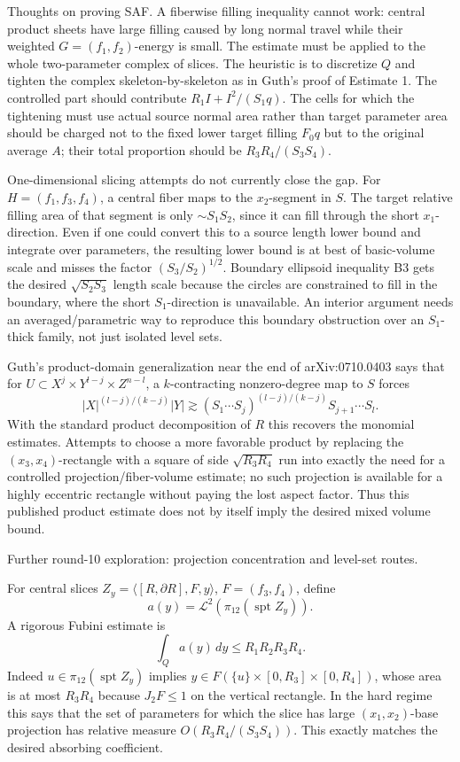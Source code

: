 \documentclass[12pt]{article}
\begin{document}
Thoughts on proving SAF.  A fiberwise filling inequality cannot work: central
product sheets have large filling caused by long normal travel while their
weighted \(G=(f_1,f_2)\)-energy is small.  The estimate must be applied to the
whole two-parameter complex of slices.  The heuristic is to discretize \(Q\) and
tighten the complex skeleton-by-skeleton as in Guth's proof of Estimate 1.  The
controlled part should contribute \(R_1I+I^2/(S_1q)\).  The cells for which the
tightening must use actual source normal area rather than target parameter area
should be charged not to the fixed lower target filling \(F_0q\) but to the
original average \(A\); their total proportion should be
\(R_3R_4/(S_3S_4)\).

One-dimensional slicing attempts do not currently close the gap.  For
\(H=(f_1,f_3,f_4)\), a central fiber maps to the \(x_2\)-segment in \(S\).
The target relative filling area of that segment is only \(\sim S_1S_2\), since
it can fill through the short \(x_1\)-direction.  Even if one could convert this
to a source length lower bound and integrate over parameters, the resulting
lower bound is at best of basic-volume scale and misses the factor
\((S_3/S_2)^{1/2}\).  Boundary ellipsoid inequality B3 gets the desired
\(\sqrt{S_2S_3}\) length scale because the circles are constrained to fill in
the boundary, where the short \(S_1\)-direction is unavailable.  An interior
argument needs an averaged/parametric way to reproduce this boundary obstruction
over an \(S_1\)-thick family, not just isolated level sets.

Guth's product-domain generalization near the end of arXiv:0710.0403 says that
for \(U\subset X^j\times Y^{l-j}\times Z^{n-l}\), a \(k\)-contracting
nonzero-degree map to \(S\) forces
\[
 |X|^{(l-j)/(k-j)}|Y|\gtrsim
 (S_1\cdots S_j)^{(l-j)/(k-j)}S_{j+1}\cdots S_l.
\]
With the standard product decomposition of \(R\) this recovers the monomial
estimates.  Attempts to choose a more favorable product by replacing the
\((x_3,x_4)\)-rectangle with a square of side \(\sqrt{R_3R_4}\) run into exactly
the need for a controlled projection/fiber-volume estimate; no such projection
is available for a highly eccentric rectangle without paying the lost aspect
factor.  Thus this published product estimate does not by itself imply the
desired mixed volume bound.



Further round-10 exploration: projection concentration and level-set routes.

For central slices \(Z_y=\langle [R,\partial R],F,y\rangle\), \(F=(f_3,f_4)\),
define
\[
 a(y)=\mathcal L^2(\pi_{12}(\operatorname{spt}Z_y)).
\]
A rigorous Fubini estimate is
\[
 \int_Q a(y)\,dy\le R_1R_2R_3R_4.
\]
Indeed \(u\in\pi_{12}(\operatorname{spt}Z_y)\) implies
\(y\in F(\{u\}\times[0,R_3]\times[0,R_4])\), whose area is at most \(R_3R_4\)
because \(J_2F\le1\) on the vertical rectangle.  In the hard regime this says
that the set of parameters for which the slice has large \((x_1,x_2)\)-base
projection has relative measure \(O(R_3R_4/(S_3S_4))\).  This exactly matches
the desired absorbing coefficient.
\end{document}
